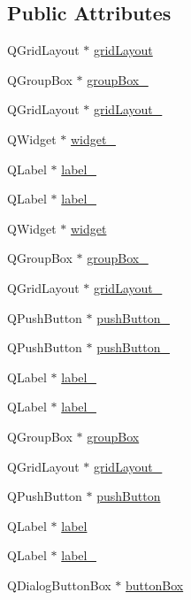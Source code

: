 \subsection*{Public Attributes}
\begin{DoxyCompactItemize}
\item 
Q\+Grid\+Layout $\ast$ \hyperlink{class_ui___tutorial_line_tool_ae8278b4d4acc9b26ff5e41896018dbb7}{grid\+Layout}
\item 
Q\+Group\+Box $\ast$ \hyperlink{class_ui___tutorial_line_tool_aac7a297d62be49df306ca51485db55b9}{group\+Box\+\_}
\item 
Q\+Grid\+Layout $\ast$ \hyperlink{class_ui___tutorial_line_tool_a5b19cfb803820e0bf6dbbd5049399b14}{grid\+Layout\+\_}
\item 
Q\+Widget $\ast$ \hyperlink{class_ui___tutorial_line_tool_aa75a71bc65f21bf083197dd534bcf95e}{widget\+\_}
\item 
Q\+Label $\ast$ \hyperlink{class_ui___tutorial_line_tool_aef3b51804ab6c5c4147549621a6d3f44}{label\+\_}
\item 
Q\+Label $\ast$ \hyperlink{class_ui___tutorial_line_tool_adc1777cbeaea98dd945f1981cc55d9a0}{label\+\_}
\item 
Q\+Widget $\ast$ \hyperlink{class_ui___tutorial_line_tool_a23abf750d7407913b339fc3c355a0f39}{widget}
\item 
Q\+Group\+Box $\ast$ \hyperlink{class_ui___tutorial_line_tool_a08f56eac86b481508d628df6e495d90f}{group\+Box\+\_}
\item 
Q\+Grid\+Layout $\ast$ \hyperlink{class_ui___tutorial_line_tool_a15a88ba2a2034f5f9d45dec12d81e2df}{grid\+Layout\+\_}
\item 
Q\+Push\+Button $\ast$ \hyperlink{class_ui___tutorial_line_tool_a5edea9a3f263fbcc561466740cf232cb}{push\+Button\+\_}
\item 
Q\+Push\+Button $\ast$ \hyperlink{class_ui___tutorial_line_tool_a2c8560f352b1a0a838d1e30d4044ecc3}{push\+Button\+\_}
\item 
Q\+Label $\ast$ \hyperlink{class_ui___tutorial_line_tool_aa6d4e0591eb37e4dbbe2071a6d5f9326}{label\+\_}
\item 
Q\+Label $\ast$ \hyperlink{class_ui___tutorial_line_tool_a3618bc42bbee059ab46d27fdeebe7286}{label\+\_}
\item 
Q\+Group\+Box $\ast$ \hyperlink{class_ui___tutorial_line_tool_ae5c609a78890875a99406c60b2fcd54c}{group\+Box}
\item 
Q\+Grid\+Layout $\ast$ \hyperlink{class_ui___tutorial_line_tool_a6e8d84fec289339b46535d2f360b24ed}{grid\+Layout\+\_}
\item 
Q\+Push\+Button $\ast$ \hyperlink{class_ui___tutorial_line_tool_a8018d808b53875c8e0ea20fe19a1228f}{push\+Button}
\item 
Q\+Label $\ast$ \hyperlink{class_ui___tutorial_line_tool_a7c0e201a32afbf07d48fba3bfd249f6c}{label}
\item 
Q\+Label $\ast$ \hyperlink{class_ui___tutorial_line_tool_a0b3e484c78e9e554d586c606660942c4}{label\+\_}
\item 
Q\+Dialog\+Button\+Box $\ast$ \hyperlink{class_ui___tutorial_line_tool_a92071438258241a995532410beff096e}{button\+Box}
\end{DoxyCompactItemize}


